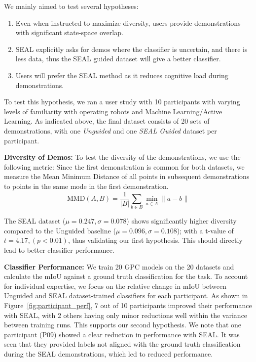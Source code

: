 \documentclass[journal]{IEEEtran}
\begin{document}
We mainly aimed to test several hypotheses:
\begin{enumerate}
    \item Even when instructed to maximize diversity, users provide demonstrations with significant state-space overlap.
    \item SEAL explicitly asks for demos where the classifier is uncertain, and there is less data, thus the SEAL guided dataset will give a better classifier.
    \item Users will prefer the SEAL method as it reduces cognitive load during demonstrations.
\end{enumerate}

To test this hypothesis, we ran a user study with 10 participants with varying levels of familiarity with operating robots and Machine Learning/Active Learning. As indicated above, the final dataset consists of 20 sets of demonstrations, with one \textit{Unguided} and one \textit{SEAL Guided} dataset per participant.



\textbf{Diversity of Demos:} To test the diversity of the demonstrations, we use the following metric: Since the first demonstration is common for both datasets, we measure the Mean Minimum Distance of all points in subsequent demonstrations to points in the same mode in the first demonstration.
$$\text{MMD}(A, B) = \frac{1}{|B|} \sum_{b \in B} \min_{a \in A} \| a - b \|$$

The SEAL dataset ($\mu = 0.247, \sigma = 0.078$) shows significantly higher diversity compared to the Unguided baseline ($\mu = 0.096, \sigma = 0.108$);  with a t-value of $t = 4.17, (p < 0.01)$, thus validating our first hypothesis. This should directly lead to better classifier performance.

\textbf{Classifier Performance: } We train 20 GPC models on the 20 datasets and calculate the mIoU against a ground truth classification for the task. To account for individual expertise, we focus on the relative change in mIoU between Unguided and SEAL dataset-trained classifiers for each participant. As shown in Figure~\ref{fig:participant_perf}, 7 out of 10 participants improved their performance with SEAL, with 2 others having only minor reductions well within the variance between training runs.
This supports our second hypothesis.
We note that one participant (P09) showed a clear reduction in performance with SEAL. It was seen that they provided labels not aligned with the ground truth classification during the SEAL demonstrations, which led to reduced performance.
\end{document}
